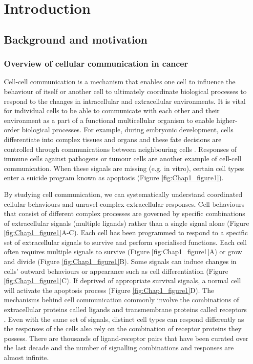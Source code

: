 \chapter[Introduction]{Introduction}
\label{Chap:Intro}


\section{Background and motivation}

\subsection{Overview of cellular communication in cancer}
Cell-cell communication is a mechanism that enables one cell to influence the behaviour of itself or another cell to ultimately coordinate biological processes to respond to the changes in intracellular and extracellular environments. It is vital for individual cells to be able to communicate with each other and their environment as a part of a functional multicellular organism to enable higher-order biological processes. For example, during embryonic development, cells differentiate into complex tissues and organs and these fate decisions are controlled through communications between neighbouring cells \cite{gale1996eph, eichmann1997ligand}. Responses of immune cells against pathogens or tumour cells are another example of cell-cell communication. When these signals are missing (e.g. in vitro), certain cell types enter a suicide program known as apoptosis (Figure \ref{fig:Chap1_figure1}). 

By studying cell communication, we can systematically understand coordinated cellular behaviours and unravel complex extracellular responses. Cell behaviours that consist of different complex processes are governed by specific combinations of extracellular signals (multiple ligands) rather than a single signal alone (Figure \ref{fig:Chap1_figure1}A-C). Each cell has been programmed to respond to a specific set of extracellular signals to survive and perform specialised functions. Each cell often requires multiple signals to survive (Figure \ref{fig:Chap1_figure1}A) or grow and divide (Figure \ref{fig:Chap1_figure1}B). Some signals can induce changes in cells' outward behaviours or appearance such as cell differentiation (Figure \ref{fig:Chap1_figure1}C). If deprived of appropriate survival signals, a normal cell will activate the apoptosis process (Figure \ref{fig:Chap1_figure1}D). The mechanisms behind cell communication commonly involve the combinations of extracellular proteins called ligands and transmembrane proteins called receptors \cite{alberts2018molecular}. Even with the same set of signals, distinct cell types can respond differently as the responses of the cells also rely on the combination of receptor proteins they possess. There are thousands of ligand-receptor pairs that have been curated over the last decade \cite{salwinski2004database, orchard2012protein} and the number of signalling combinations and responses are almost infinite.

